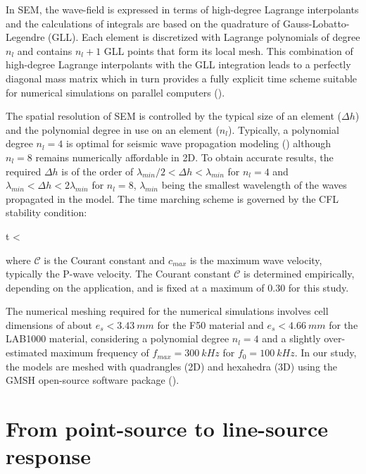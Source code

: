 \documentclass[extra,mreferee]{gji}
\begin{document}
In SEM, the wave-field is expressed in terms of high-degree Lagrange interpolants and the calculations of integrals are based on the quadrature of Gauss-Lobatto-Legendre (GLL). Each element is discretized with Lagrange polynomials of degree $n_{l}$ and contains $n_{l}+1$ GLL points that form its local mesh. This combination of high-degree Lagrange interpolants with the GLL integration leads to a perfectly diagonal mass matrix which in turn provides a fully explicit time scheme suitable for numerical simulations on parallel computers (\cite{komatitsch1998spectral,komatitsch1999spectral}).

The spatial resolution of SEM is controlled by the typical size of an element ($\Delta h$) and the polynomial degree in use on an element ($n_{l}$). Typically, a polynomial degree $n_{l}=4$ is optimal for seismic wave propagation modeling (\cite{moczo2011finite}) although $n_{l}=8$ remains numerically affordable in 2D. To obtain accurate results, the required $\Delta h$ is of the order of $\lambda_{min} /2 < \Delta h < \lambda_{min}$ for $n_{l}=4$ and $\lambda_{min} < \Delta h < 2\lambda_{min}$ for $n_{l}=8$, $\lambda_{min}$ being the smallest wavelength of the waves propagated in the model. The time marching scheme is governed by the CFL stability condition:

\equation
\Delta t < \,
\endequation

where $\mathcal{C}$ is the Courant constant and $c_{max}$ is the maximum wave velocity, typically the P-wave velocity. The Courant constant $\mathcal{C}$ is determined empirically, depending on the application, and is fixed at a maximum of 0.30 for this study.

The numerical meshing required for the numerical simulations involves cell dimensions of about $e_{s}<3.43\ mm$ for the F50 material and $e_{s}<4.66\ mm$ for the LAB1000 material, considering a polynomial degree $n_{l}=4$ and a slightly over-estimated maximum frequency of $f_{max}=300\ kHz$ for $f_{0}=100\ kHz$. In our study, the models are meshed with quadrangles (2D) and hexahedra (3D) using the GMSH open-source software package (\cite{Geuzaine_MSH_2009}).

\section{From point-source to line-source response}
\end{document}
